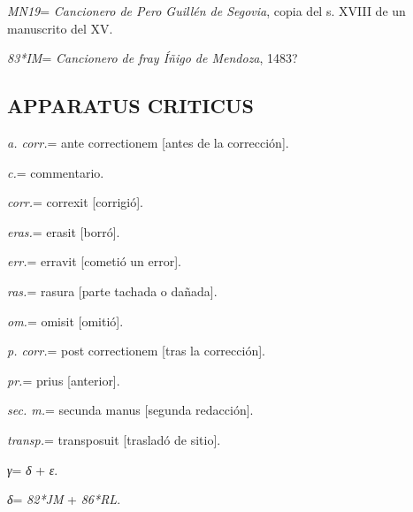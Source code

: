 \documentclass[11pt,a4paper,twoside]{article}
\begin{document}
\textit{MN19}= \textit{Cancionero de Pero Guillén de Segovia}, copia del s. XVIII de un manuscrito del XV.

\textit{83*IM}= \textit{Cancionero de fray Íñigo de Mendoza}, 1483?

\subsection*{{\fontsize{11}{11.96}\selectfont APPARATUS CRITICUS}}

\textit{a. corr.}= ante correctionem [antes de la corrección].

\textit{c.}= commentario.

\textit{corr.}= correxit [corrigió].

\textit{eras.}= erasit [borró].

\textit{err.}= erravit [cometió un error].

\textit{ras.}= rasura [parte tachada o dañada].

\textit{om.}= omisit [omitió].

\textit{p. corr.}= post correctionem [tras la corrección].

\textit{pr.}= prius [anterior].

\textit{sec. m.}= secunda manus [segunda redacción].

\textit{transp.}= transposuit [trasladó de sitio].

\textit{γ}= \textit{δ} + \textit{ε}.

\textit{δ}= \textit{82*JM} + \textit{86*RL}.
\end{document}

